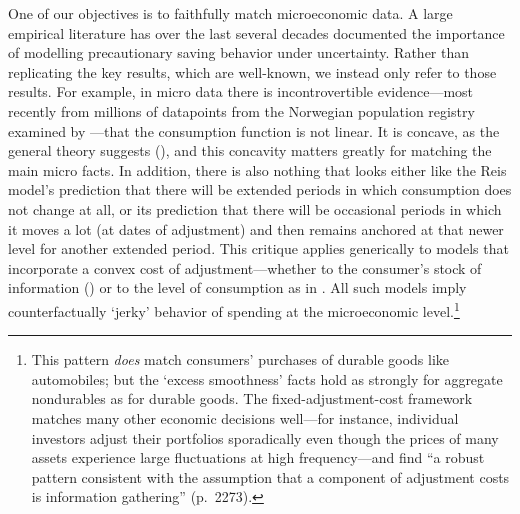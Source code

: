 \documentclass[titlepage]{\econtex}\newcommand{\texname}{cAndCwithStickyE}
\begin{document}
One of our objectives is to faithfully match microeconomic data. A large  empirical literature has over the last several decades documented the importance of modelling precautionary saving behavior under uncertainty. Rather than replicating the key results, which are well-known, we instead only refer to those results. For example, in micro data there is incontrovertible evidence---most recently from millions of datapoints from the Norwegian population registry examined by \cite{fhnMPC}---that the consumption function is not linear.  It is concave, as the general theory suggests (\cite{carroll&kimball:concavity}), and this concavity matters greatly for matching the main micro facts.  In addition, there is also nothing that looks  either like the Reis model's prediction that there will be extended periods in which consumption does not change at all, or its prediction that there will be occasional periods in which it moves a lot (at dates of adjustment) and then remains anchored at that newer level for another extended period.  This critique applies generically to models that incorporate a convex cost of adjustment---whether to the consumer's stock of information (\cite{reis:inattentive}) or to the level of consumption as in \cite{chettySzeidl:cCommitmentsEcta}.  All such models imply counterfactually `jerky' behavior of spending at the microeconomic level.\footnote{This pattern {\it does} match consumers' purchases of durable goods like automobiles; but the `excess smoothness' facts hold as strongly for aggregate nondurables as for durable goods.  The fixed-adjustment-cost framework matches many other economic decisions well---for instance, individual investors adjust their portfolios sporadically even though the prices of many assets experience large fluctuations at high frequency---and \cite{alvarezGuisoLippi:DurCons} find ``a robust pattern consistent with the assumption that a component of adjustment costs is information gathering'' (p.~2273).}
\end{document}
